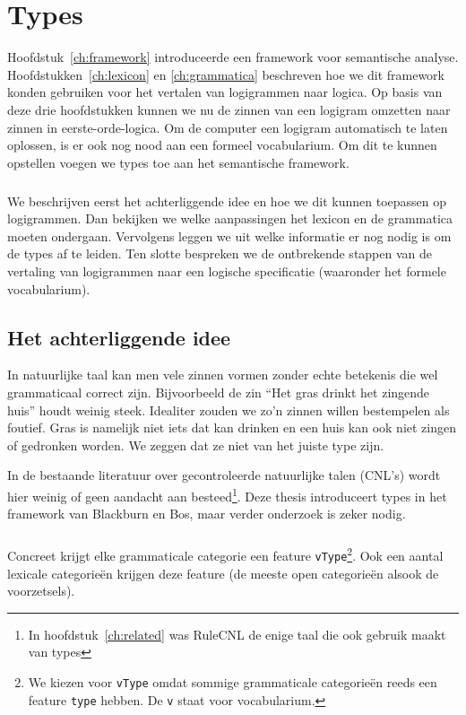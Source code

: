 \chapter{Types}
\label{ch:types}

Hoofdstuk~\ref{ch:framework} introduceerde een framework voor semantische analyse. Hoofdstukken~\ref{ch:lexicon} en \ref{ch:grammatica} beschreven hoe we dit framework konden gebruiken voor het vertalen van logigrammen naar logica. Op basis van deze drie hoofdstukken kunnen we nu de zinnen van een logigram omzetten naar zinnen in eerste-orde-logica. Om de computer een logigram automatisch te laten oplossen, is er ook nog nood aan een formeel vocabularium. Om dit te kunnen opstellen voegen we types toe aan het semantische framework.

\paragraph{} We beschrijven eerst het achterliggende idee en hoe we dit kunnen toepassen op logigrammen. Dan bekijken we welke aanpassingen het lexicon en de grammatica moeten ondergaan. Vervolgens leggen we uit welke informatie er nog nodig is om de types af te leiden. Ten slotte bespreken we de ontbrekende stappen van de vertaling van logigrammen naar een logische specificatie (waaronder het formele vocabularium).

\section{Het achterliggende idee}
In natuurlijke taal kan men vele zinnen vormen zonder echte betekenis die wel grammaticaal correct zijn. Bijvoorbeeld de zin ``Het gras drinkt het zingende huis'' houdt weinig steek. Idealiter zouden we zo'n zinnen willen bestempelen als foutief. Gras is namelijk niet iets dat kan drinken en een huis kan ook niet zingen of gedronken worden. We zeggen dat ze niet van het juiste type zijn.

In de bestaande literatuur over gecontroleerde natuurlijke talen (CNL's) wordt hier weinig of geen aandacht aan besteed\footnote{In hoofdstuk~\ref{ch:related} was RuleCNL de enige taal die ook gebruik maakt van types}. Deze thesis introduceert types in het framework van Blackburn en Bos, maar verder onderzoek is zeker nodig. 

\paragraph{} Concreet krijgt elke grammaticale categorie een feature \texttt{vType}\footnote{We kiezen voor \texttt{vType} omdat sommige grammaticale categorieën reeds een feature \texttt{type} hebben. De \texttt{v} staat voor vocabularium.}. Ook een aantal lexicale categorieën krijgen deze feature (de meeste open categorieën alsook de voorzetsels).

